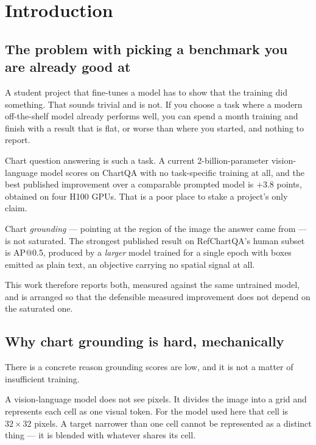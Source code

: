 \section{Introduction}
\label{sec:intro}

\subsection{The problem with picking a benchmark you are already good at}

A student project that fine-tunes a model has to show that the training did something. That sounds
trivial and is not. If you choose a task where a modern off-the-shelf model already performs well,
you can spend a month training and finish with a result that is flat, or worse than where you
started, and nothing to report.

Chart question answering is such a task. A current 2-billion-parameter vision-language model scores
 on ChartQA with no task-specific training at all, and the best published improvement
over a comparable prompted model is $+3.8$ points, obtained on four H100 GPUs. That is a poor place
to stake a project's only claim.

Chart \emph{grounding} --- pointing at the region of the image the answer came from --- is not
saturated. The strongest published result on RefChartQA's human subset is  AP@0.5,
produced by a \emph{larger} model trained for a single epoch with boxes emitted as plain text, an
objective carrying no spatial signal at all.

This work therefore reports both, measured against the same untrained model, and is arranged so
that the defensible measured improvement does not depend on the saturated one.

\subsection{Why chart grounding is hard, mechanically}

There is a concrete reason grounding scores are low, and it is not a matter of insufficient training.

A vision-language model does not see pixels. It divides the image into a grid and represents each
cell as one visual token. For the model used here that cell is $32 \times 32$ pixels. A target
narrower than one cell cannot be represented as a distinct thing --- it is blended with whatever
shares its cell.


